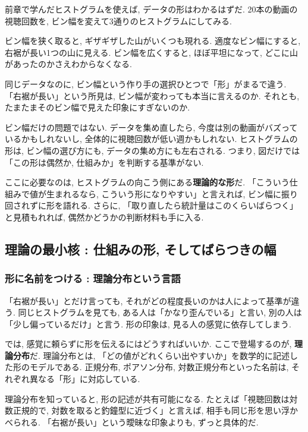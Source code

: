     前章で学んだヒストグラムを使えば, データの形はわかるはずだ.
    20本の動画の視聴回数を, ビン幅を変えて3通りのヒストグラムにしてみる.


    ビン幅を狭く取ると, ギザギザした山がいくつも現れる.
    適度なビン幅にすると, 右裾が長い1つの山に見える.
    ビン幅を広くすると, ほぼ平坦になって, どこに山があったのかさえわからなくなる.

    同じデータなのに, ビン幅という作り手の選択ひとつで「形」がまるで違う.
    「右裾が長い」という所見は, ビン幅が変わっても本当に言えるのか.
    それとも, たまたまそのビン幅で見えた印象にすぎないのか.

    ビン幅だけの問題ではない.
    データを集め直したら, 今度は別の動画がバズっているかもしれないし, 全体的に視聴回数が低い週かもしれない.
    ヒストグラムの形は, ビン幅の選び方にも, データの集め方にも左右される.
    つまり, 図だけでは「この形は偶然か, 仕組みか」を判断する基準がない.

    ここに必要なのは, ヒストグラムの向こう側にある\textbf{理論的な形}だ.
    「こういう仕組みで値が生まれるなら, こういう形になりやすい」と言えれば, ビン幅に振り回されずに形を語れる.
    さらに, 「取り直したら統計量はこのくらいばらつく」と見積もれれば, 偶然かどうかの判断材料も手に入る.

  \subsection{理論の最小核 : 仕組みの形, そしてばらつきの幅}

    \subsubsection{形に名前をつける : 理論分布という言語}

    「右裾が長い」とだけ言っても, それがどの程度長いのかは人によって基準が違う.
    同じヒストグラムを見ても, ある人は「かなり歪んでいる」と言い, 別の人は「少し偏っているだけ」と言う.
    形の印象は, 見る人の感覚に依存してしまう.

    では, 感覚に頼らずに形を伝えるにはどうすればいいか.
    ここで登場するのが, \textbf{理論分布}だ.
    理論分布とは, 「どの値がどれくらい出やすいか」を数学的に記述した形のモデルである.
    正規分布, ポアソン分布, 対数正規分布といった名前は, それぞれ異なる「形」に対応している.

    理論分布を知っていると, 形の記述が共有可能になる.
    たとえば「視聴回数は対数正規的で, 対数を取ると釣鐘型に近づく」と言えば, 相手も同じ形を思い浮かべられる.
    「右裾が長い」という曖昧な印象よりも, ずっと具体的だ.

